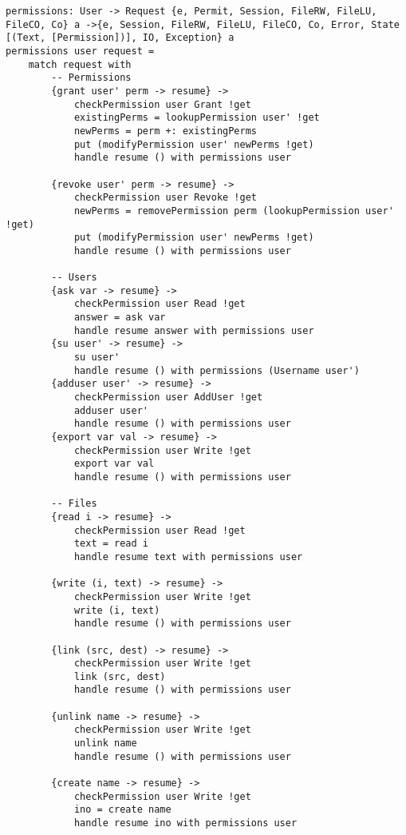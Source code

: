 \documentclass[logo,bsc,singlespacing,parskip]{infthesis}
\begin{document}
\begin{lstlisting}[language=unison]
permissions: User -> Request {e, Permit, Session, FileRW, FileLU, FileCO, Co} a ->{e, Session, FileRW, FileLU, FileCO, Co, Error, State [(Text, [Permission])], IO, Exception} a
permissions user request = 
    match request with
        -- Permissions 
        {grant user' perm -> resume} -> 
            checkPermission user Grant !get
            existingPerms = lookupPermission user' !get 
            newPerms = perm +: existingPerms
            put (modifyPermission user' newPerms !get)
            handle resume () with permissions user
        
        {revoke user' perm -> resume} ->
            checkPermission user Revoke !get
            newPerms = removePermission perm (lookupPermission user' !get)
            put (modifyPermission user' newPerms !get)
            handle resume () with permissions user

        -- Users
        {ask var -> resume} -> 
            checkPermission user Read !get
            answer = ask var
            handle resume answer with permissions user 
        {su user' -> resume} -> 
            su user'
            handle resume () with permissions (Username user')
        {adduser user' -> resume} -> 
            checkPermission user AddUser !get
            adduser user'
            handle resume () with permissions user
        {export var val -> resume} -> 
            checkPermission user Write !get
            export var val
            handle resume () with permissions user

        -- Files
        {read i -> resume} -> 
            checkPermission user Read !get
            text = read i
            handle resume text with permissions user

        {write (i, text) -> resume} -> 
            checkPermission user Write !get
            write (i, text)
            handle resume () with permissions user
        
        {link (src, dest) -> resume} -> 
            checkPermission user Write !get
            link (src, dest)
            handle resume () with permissions user
        
        {unlink name -> resume} ->
            checkPermission user Write !get
            unlink name
            handle resume () with permissions user

        {create name -> resume} -> 
            checkPermission user Write !get
            ino = create name
            handle resume ino with permissions user


\end{lstlisting}
\end{document}
